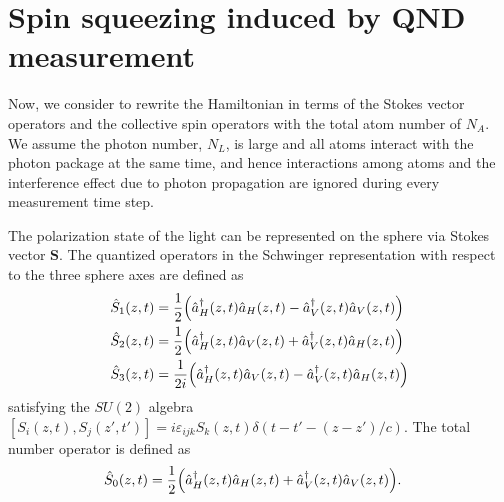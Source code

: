 \section{Spin squeezing induced by QND measurement}

Now, we consider to rewrite the Hamiltonian in terms of the Stokes vector operators and the collective spin operators with the total atom number of $ N_A $. We assume the photon number, $ N_L $, is large and all atoms interact with the photon package at the same time, and hence interactions among atoms and the interference effect due to photon propagation are ignored during every measurement time step. 

The polarization state of the light can be represented on the \Poincare sphere via Stokes vector $ \mathbf{S} $. The quantized operators in the Schwinger representation with respect to the three \Poincare sphere axes are defined as  
\begin{align}
\hat{S}_1(z,t)&= \frac{1}{2} \Big( \hat{a}_H^\dagger(z,t) \hat{a}_H(z,t) -  \hat{a}_V^\dagger(z,t) \hat{a}_V(z,t) \Big) \\
\hat{S}_2(z,t)&= \frac{1}{2} \Big( \hat{a}_H^\dagger(z,t) \hat{a}_V(z,t) +  \hat{a}_V^\dagger(z,t) \hat{a}_H(z,t) \Big)\\
\hat{S}_3(z,t)&= \frac{1}{2i} \Big( \hat{a}_H^\dagger(z,t) \hat{a}_V(z,t) -  \hat{a}_V^\dagger(z,t) \hat{a}_H(z,t) \Big)
\end{align}
satisfying the $ SU(2) $ algebra $ [S_i(z,t),S_j(z',t')]=i\varepsilon_{ijk}S_k(z,t)\delta (t-t' - (z-z')/c ) $. The total number operator is defined as
\begin{align}
\hat{S}_0(z,t)&= \frac{1}{2} \Big( \hat{a}_H^\dagger(z,t) \hat{a}_H(z,t) +  \hat{a}_V^\dagger(z,t) \hat{a}_V(z,t) \Big).
\end{align}

